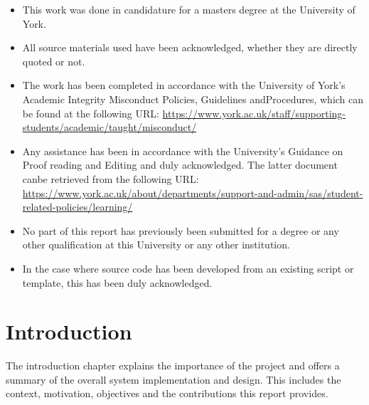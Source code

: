 \documentclass[12pt, oneside]{book}
\begin{document}
\begin{itemize}
	\itemsep0em 
  \item This work was done in candidature for a masters degree at the University of York.
  \item All source materials used have been acknowledged, whether they are directly quoted or not.
	\item The work has been completed in accordance with the University of York’s Academic Integrity Misconduct Policies, Guidelines andProcedures, which can be found at the following URL:
	      \newline\url{https://www.york.ac.uk/staff/supporting-students/academic/taught/misconduct/}
	\item Any assistance has been in accordance with the University’s Guidance on Proof reading and Editing and duly acknowledged. The latter document canbe retrieved from the following URL:\newline
	      \url{https://www.york.ac.uk/about/departments/support-and-admin/sas/student-related-policies/learning/}
	\item No part of this report has previously been submitted for a degree or any other qualification at this University or any other institution.
	\item In the case where source code has been developed from an existing script or template, this has been duly acknowledged.
\end{itemize}


\mainmatter
\chapter{Introduction}
The introduction chapter explains the importance of the project and offers a summary of
the overall system implementation and design.
This includes the context, motivation, objectives and the contributions this report provides.
\end{document}
